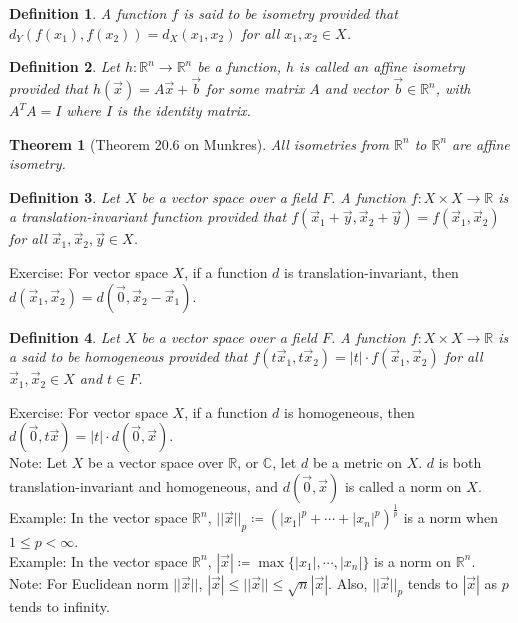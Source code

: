 \documentclass[11pt,oneside]{book}
\theoremstyle{break}
\theoremstyle{break}
\newtheorem{thm}{Theorem}[section]
\newtheorem{defn}{Definition}[corL]
\newcommand{\R}{\mathbb{R}}
\newcommand{\Complex}{\mathbb{C}}
\newcommand{\note}{\color{red}Note: \color{black}}
\newcommand{\example}{\color{green}Example: \color{black}}
\newcommand{\exercise}{\color{green}Exercise: \color{black}}
\begin{document}
\begin{defn}
A function $f$ is said to be isometry provided that $d_Y(f(x_1),f(x_2)) = d_X(x_1,x_2)$ for all $x_1,x_2 \in X$. 
\end{defn}

\begin{defn}
Let $h:\R^n \to \R^n$ be a function, $h$ is called an affine isometry provided that $h(\vec{x})= A\vec{x}+\vec{b}$ for some matrix $A$ and vector $\vec{b}\in \R^n$, with $A^TA = I$ where $I$ is the identity matrix. 
\end{defn}

\begin{thm}[Theorem 20.6 on Munkres]
All isometries from $\R^n$ to $\R^n$ are affine isometry.
\end{thm}

\begin{defn}
Let $X$ be a vector space over a field $F$. A function $f: X \times X \to \R$ is a translation-invariant function provided that $f(\vec{x}_1+\vec{y},\vec{x}_2+\vec{y}) = f(\vec{x}_1,\vec{x}_2)$ for all $\vec{x}_1,\vec{x}_2,\vec{y}\in X$.
\end{defn}

\exercise For vector space $X$, if a function $d$ is translation-invariant, then $d(\vec{x}_1,\vec{x}_2) = d(\vec{0},\vec{x}_2-\vec{x}_1)$.

\begin{defn}
Let $X$ be a vector space over a field $F$. A function $f:X \times X \to \R$ is a said to be homogeneous provided that $f(t\vec{x}_1,t\vec{x}_2) = |t|\cdot f(\vec{x}_1,\vec{x}_2)$ for all $\vec{x}_1,\vec{x}_2\in X$ and $t \in F$.
\end{defn}


\exercise For vector space $X$, if a function $d$ is homogeneous, then $d(\vec{0},t\vec{x}) = |t|\cdot d(\vec{0},\vec{x})$. \\


\note Let $X$ be a vector space over $\R$, or $\Complex$, let $d$ be a metric on $X$. $d$ is both translation-invariant and homogeneous, and $d(\vec{0},\vec{x})$ is called a norm on $X$.\\


\example In the vector space $\R^n$, $||\vec{x}||_p \coloneqq (|x_1|^p + \cdots + |x_n|^p )^\frac{1}{p}$ is a norm when $1\leq p < \infty$.\\
\example In the vector space $\R^n$, $|\vec{x}| \coloneqq \max\{|x_1|,\cdots, |x_n|\}$ is a norm on $\R^n$.\\
\note For Euclidean norm $||\vec{x}||$, $|\vec{x}|\leq ||\vec{x}|| \leq  \sqrt{n}|\vec{x}|$. Also, $||\vec{x}||_p$ tends to $|\vec{x}|$ as $p$ tends to infinity.
\end{document}
